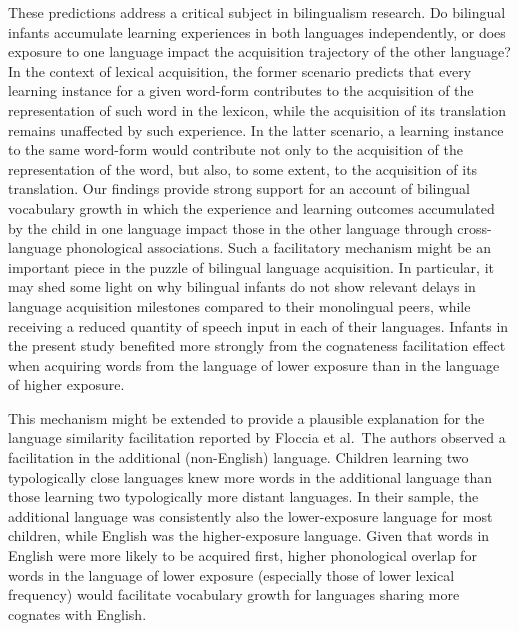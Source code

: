 \documentclass[
]{article}
\begin{document}
These predictions address a critical subject in bilingualism research.
Do bilingual infants accumulate learning experiences in both languages
independently, or does exposure to one language impact the acquisition
trajectory of the other language? In the context of lexical acquisition,
the former scenario predicts that every learning instance for a given
word-form contributes to the acquisition of the representation of such
word in the lexicon, while the acquisition of its translation remains
unaffected by such experience. In the latter scenario, a learning
instance to the same word-form would contribute not only to the
acquisition of the representation of the word, but also, to some extent,
to the acquisition of its translation. Our findings provide strong
support for an account of bilingual vocabulary growth in which the
experience and learning outcomes accumulated by the child in one
language impact those in the other language through cross-language
phonological associations. Such a facilitatory mechanism might be an
important piece in the puzzle of bilingual language acquisition. In
particular, it may shed some light on why bilingual infants do not show
relevant delays in language acquisition milestones compared to their
monolingual peers, while receiving a reduced quantity of speech input in
each of their languages. Infants in the present study benefited more
strongly from the cognateness facilitation effect when acquiring words
from the language of lower exposure than in the language of higher
exposure.

This mechanism might be extended to provide a plausible explanation for
the language similarity facilitation reported by Floccia et al.~The
authors observed a facilitation in the additional (non-English)
language. Children learning two typologically close languages knew more
words in the additional language than those learning two typologically
more distant languages. In their sample, the additional language was
consistently also the lower-exposure language for most children, while
English was the higher-exposure language. Given that words in English
were more likely to be acquired first, higher phonological overlap for
words in the language of lower exposure (especially those of lower
lexical frequency) would facilitate vocabulary growth for languages
sharing more cognates with English.
\end{document}
